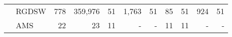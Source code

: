 \begin{table}[H]
\begin{tabular}{llrrrrrrrrr}
\cline{2-11}
\bfseries  & RGDSW & 778 & {\cellcolor[HTML]{E2E4FB}} \color[HTML]{000000} 359,976 & 51 & {\cellcolor[HTML]{ACB8F4}} \color[HTML]{000000} 1,763 & 51 & {\cellcolor[HTML]{768BEC}} \color[HTML]{F1F1F1} 85 & 51 & {\cellcolor[HTML]{405FE5}} \color[HTML]{F1F1F1} 924 & 51 \\
\cline{2-11}
\bfseries  & AMS & 22 & {\cellcolor[HTML]{405FE5}} \color[HTML]{F1F1F1} 23 & 11 & {\cellcolor[HTML]{ACB8F4}} \color[HTML]{000000} {\cellcolor[HTML]{E2E4FB}} - & - & {\cellcolor[HTML]{768BEC}} \color[HTML]{F1F1F1} 11 & 11 & {\cellcolor[HTML]{E2E4FB}} \color[HTML]{000000} {\cellcolor[HTML]{E2E4FB}} - & - \\
\cline{1-11} \cline{2-11}
\bottomrule
\end{tabular}
\end{table}
